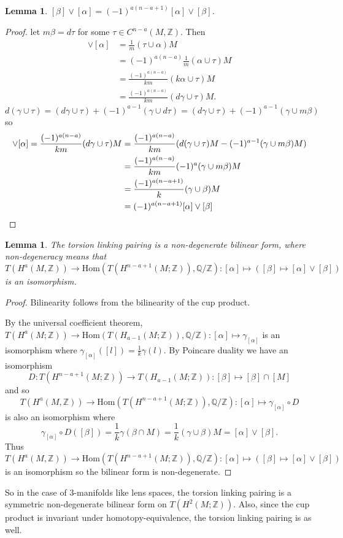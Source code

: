 \documentclass{article}
\newtheorem{lemma}[theorem]{Lemma}
\begin{document}
\begin{lemma}
$[\beta]\vee[\alpha]=(-1)^{a(n-a+1)}[\alpha]\vee[\beta]$.
\end{lemma}
\begin{proof}
let $m\beta=d\tau$ for some $\tau\in C^{n-a}(M,\mathbb{Z})$. Then 
\begin{align*}
[\beta]\vee[\alpha]&=\frac{1}{m}(\tau\cup\alpha)M\\&=(-1)^{a(n-a)}\frac{1}{m}(\alpha\cup\tau)M\\&=\frac{(-1)^{a(n-a)}}{km}(k\alpha\cup\tau)M\\&=\frac{(-1)^{a(n-a)}}{km}(d\gamma\cup\tau)M.\end{align*} \[d(\gamma\cup\tau)=(d\gamma\cup\tau)+(-1)^{a-1}(\gamma\cup d\tau)=(d\gamma\cup\tau)+(-1)^{a-1}(\gamma\cup m\beta)\] so \begin{align*}[\beta]\vee[\alpha]=\frac{(-1)^{a(n-a)}}{km}(d\gamma\cup\tau)M&=\frac{(-1)^{a(n-a)}}{km}(d(\gamma\cup\tau)M-(-1)^{a-1}(\gamma\cup m\beta)M)\\&=\frac{(-1)^{a(n-a)}}{km}(-1)^a(\gamma\cup m\beta)M\\&=\frac{(-1)^{a(n-a+1)}}{k}(\gamma\cup\beta)M\\&=(-1)^{a(n-a+1)}[\alpha]\vee[\beta]\qedhere\end{align*}
\end{proof}

\begin{lemma}
The torsion linking pairing is a non-degenerate bilinear form, where non-degeneracy means that $T(H^a(M,\mathbb{Z}))\to \text{Hom}(T(H^{n-a+1}(M;\mathbb{Z})),\mathbb{Q}/\mathbb{Z}):[\alpha]\mapsto ([\beta]\mapsto [\alpha]\vee[\beta])$ is an isomorphism.
\end{lemma}
\begin{proof}
Bilinearity follows from the bilinearity of the cup product.

\noindent By the universal coefficient theorem, $T(H^{a}(M;\mathbb{Z}))\to\text{Hom}(T(H_{a-1}(M;\mathbb{Z})),\mathbb{Q}/\mathbb{Z}):[\alpha]\mapsto\gamma_{[\alpha]}$ is an isomorphism where $\gamma_{[\alpha]}([l])=\frac{1}{k}\gamma(l)$. By Poincare duality we have an isomorphism \[D\colon T(H^{n-a+1}(M;\mathbb{Z}))\to T(H_{a-1}(M;\mathbb{Z})):[\beta]\mapsto[\beta]\cap[M]\] and so \[T(H^a(M,\mathbb{Z}))\to \text{Hom}(T(H^{n-a+1}(M;\mathbb{Z})),\mathbb{Q}/\mathbb{Z}):[\alpha]\mapsto\gamma_{[\alpha]}\circ D\] is also an isomorphism where \[\gamma_{[\alpha]}\circ D([\beta])=\frac{1}{k}\gamma(\beta\cap M)=\frac{1}{k}(\gamma\cup\beta)M=[\alpha]\vee[\beta].\] Thus \[T(H^a(M,\mathbb{Z}))\to \text{Hom}(T(H^{n-a+1}(M;\mathbb{Z})),\mathbb{Q}/\mathbb{Z}):[\alpha]\mapsto ([\beta]\mapsto [\alpha]\vee[\beta])\] is an isomorphism so the bilinear form is non-degenerate.
\end{proof}
\noindent So in the case of 3-manifolds like lens spaces, the torsion linking pairing is a symmetric non-degenerate bilinear form on $T(H^2(M;\mathbb{Z}))$. Also, since the cup product is invariant under homotopy-equivalence, the torsion linking pairing is as well.
\end{document}
